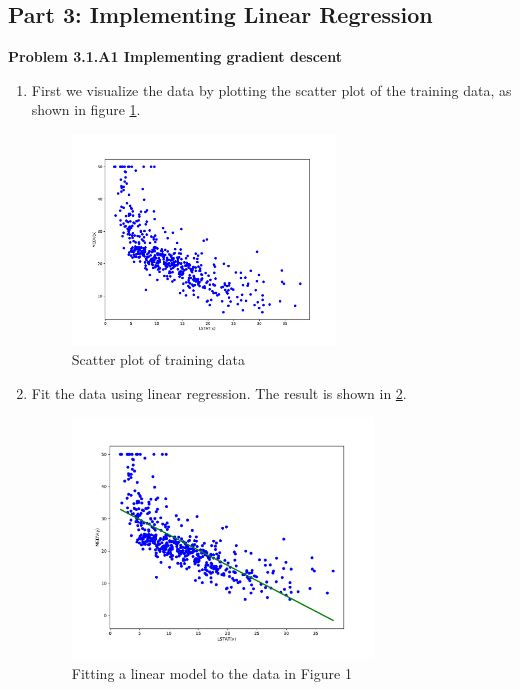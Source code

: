 \documentclass[]{book}
\theoremstyle{definition}
\begin{document}
\subsection*{Part 3: Implementing Linear Regression}
\textbf{Problem 3.1.A1 Implementing gradient descent}
\begin{enumerate}
\item First we visualize the data by plotting the scatter plot of the training data, as shown in figure \ref{fig:1}.  
	\begin{figure}[H]
		\centering
		\includegraphics[width=7cm]{fig1.pdf}
		\caption{Scatter plot of training data}
		\label{fig:1}
	\end{figure}






\item Fit the data using linear regression. The result is shown in \ref{fig:2}. 
	\begin{figure}[H]
		\centering 
		\includegraphics[width=8cm]{fig2a.pdf}
		\caption{Fitting a linear model to the data in Figure 1}
		\label{fig:2}
	\end{figure} 


\end{enumerate}
\end{document}

